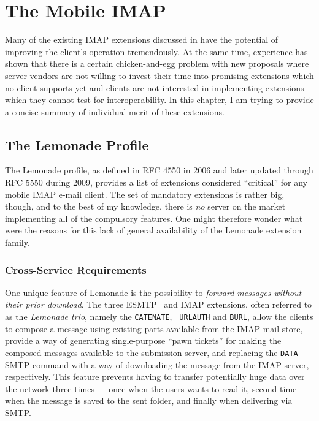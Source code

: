 \documentclass[trojita]{subfiles}
\begin{document}
\chapter{The Mobile IMAP}
\label{sec:mobile-imap}

Many of the existing IMAP extensions discussed in  have the potential of improving the
client's operation tremendously.  At the same time, experience has shown that there is a certain chicken-and-egg problem
with new proposals where server vendors are not willing to invest their time into promising extensions which no client
supports yet and clients are not interested in implementing extensions which they cannot test for interoperability.  In
this chapter, I am trying to provide a concise summary of individual merit of these extensions.

\section{The Lemonade Profile}
\label{sec:lemonade-comparison}

The Lemonade profile, as defined in RFC 4550 \cite{rfc4550} in 2006 and later updated through RFC 5550 \cite{rfc5550}
during 2009, provides a list of extensions considered ``critical'' for any mobile IMAP e-mail client.  The set of
mandatory extensions is rather big, though, and to the best of my knowledge, there is {\em no} server on the market
implementing all of the compulsory features.  One might therefore wonder what were the reasons for this lack of general
availability of the Lemonade extension family.

\subsection{Cross-Service Requirements}

One unique feature of Lemonade is the possibility to {\em forward messages without their prior download}.  The three
ESMTP~\cite{rfc5321} and IMAP extensions, often referred to as the {\em Lemonade trio}, namely the {\tt CATENATE}, {\tt
URLAUTH} and {\tt BURL}, allow the clients to compose a message using existing parts available from the IMAP mail store,
provide a way of generating single-purpose ``pawn tickets'' for making the composed messages available to the submission
server, and replacing the {\tt DATA} SMTP command with a way of downloading the message from the IMAP server,
respectively.  This feature prevents having to transfer potentially huge data over the network three times --- once when
the users wants to read it, second time when the message is saved to the sent folder, and finally when delivering via
SMTP.
\end{document}
